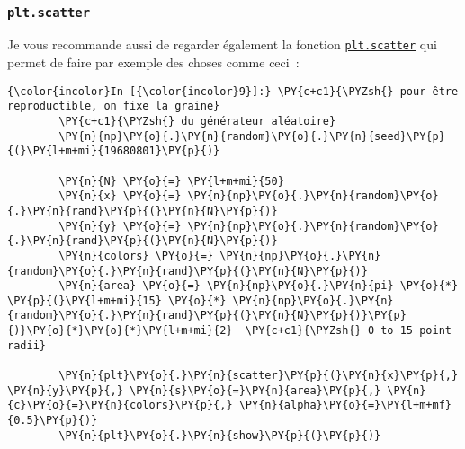     \begin{center}
    \end{center}
    { \hspace*{\fill} \\}
    
    \hypertarget{plt.scatter}{%
\subsubsection{\texorpdfstring{\texttt{plt.scatter}}{plt.scatter}}\label{plt.scatter}}

    Je vous recommande aussi de regarder également la fonction
\href{https://matplotlib.org/api/_as_gen/matplotlib.pyplot.scatter.html?highlight=matplotlib\%20pyplot\%20scatter\#matplotlib.pyplot.scatter}{\texttt{plt.scatter}}
qui permet de faire par exemple des choses comme ceci~:

    \begin{Verbatim}[commandchars=\\\{\}]
{\color{incolor}In [{\color{incolor}9}]:} \PY{c+c1}{\PYZsh{} pour être reproductible, on fixe la graine}
        \PY{c+c1}{\PYZsh{} du générateur aléatoire}
        \PY{n}{np}\PY{o}{.}\PY{n}{random}\PY{o}{.}\PY{n}{seed}\PY{p}{(}\PY{l+m+mi}{19680801}\PY{p}{)}
        
        \PY{n}{N} \PY{o}{=} \PY{l+m+mi}{50}
        \PY{n}{x} \PY{o}{=} \PY{n}{np}\PY{o}{.}\PY{n}{random}\PY{o}{.}\PY{n}{rand}\PY{p}{(}\PY{n}{N}\PY{p}{)}
        \PY{n}{y} \PY{o}{=} \PY{n}{np}\PY{o}{.}\PY{n}{random}\PY{o}{.}\PY{n}{rand}\PY{p}{(}\PY{n}{N}\PY{p}{)}
        \PY{n}{colors} \PY{o}{=} \PY{n}{np}\PY{o}{.}\PY{n}{random}\PY{o}{.}\PY{n}{rand}\PY{p}{(}\PY{n}{N}\PY{p}{)}
        \PY{n}{area} \PY{o}{=} \PY{n}{np}\PY{o}{.}\PY{n}{pi} \PY{o}{*} \PY{p}{(}\PY{l+m+mi}{15} \PY{o}{*} \PY{n}{np}\PY{o}{.}\PY{n}{random}\PY{o}{.}\PY{n}{rand}\PY{p}{(}\PY{n}{N}\PY{p}{)}\PY{p}{)}\PY{o}{*}\PY{o}{*}\PY{l+m+mi}{2}  \PY{c+c1}{\PYZsh{} 0 to 15 point radii}
        
        \PY{n}{plt}\PY{o}{.}\PY{n}{scatter}\PY{p}{(}\PY{n}{x}\PY{p}{,} \PY{n}{y}\PY{p}{,} \PY{n}{s}\PY{o}{=}\PY{n}{area}\PY{p}{,} \PY{n}{c}\PY{o}{=}\PY{n}{colors}\PY{p}{,} \PY{n}{alpha}\PY{o}{=}\PY{l+m+mf}{0.5}\PY{p}{)}
        \PY{n}{plt}\PY{o}{.}\PY{n}{show}\PY{p}{(}\PY{p}{)}
\end{Verbatim}


    \begin{center}
    \end{center}
    { \hspace*{\fill} \\}
    
